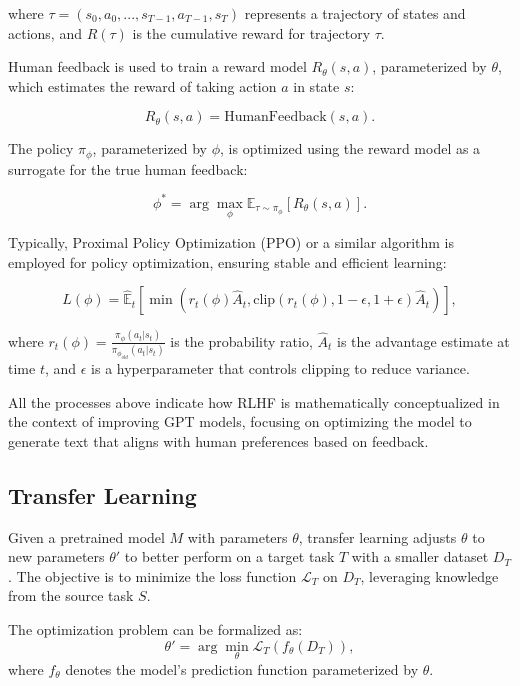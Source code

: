 \documentclass[11pt,a4paper,oneside]{report}
\begin{document}
where $\tau = (s_0, a_0, ..., s_{T-1}, a_{T-1}, s_T)$ represents a trajectory of states and actions, and $R(\tau)$ is the cumulative reward for trajectory $\tau$.

Human feedback is used to train a reward model $R_{\theta}(s,a)$, parameterized by $\theta$, which estimates the reward of taking action $a$ in state $s$:

\begin{equation}
R_{\theta}(s,a) = \text{HumanFeedback}(s, a).
\end{equation}

The policy $\pi_{\phi}$, parameterized by $\phi$, is optimized using the reward model as a surrogate for the true human feedback:

\begin{equation}
\phi^{*} = \arg\max_{\phi} \mathbb{E}_{\tau \sim \pi_{\phi}} [R_{\theta}(s,a)].
\end{equation}

Typically, Proximal Policy Optimization (PPO) or a similar algorithm is employed for policy optimization, ensuring stable and efficient learning:

\begin{equation}
L(\phi) = \hat{\mathbb{E}}_t \left[ \min(r_t(\phi) \hat{A}_t, \text{clip}(r_t(\phi), 1-\epsilon, 1+\epsilon) \hat{A}_t) \right],
\end{equation}

where $r_t(\phi) = \frac{\pi_{\phi}(a_t|s_t)}{\pi_{\phi_{old}}(a_t|s_t)}$ is the probability ratio, $\hat{A}_t$ is the advantage estimate at time $t$, and $\epsilon$ is a hyperparameter that controls clipping to reduce variance.

All the processes above indicate how RLHF is mathematically conceptualized in the context of improving GPT models, focusing on optimizing the model to generate text that aligns with human preferences based on feedback.

\subsection{Transfer Learning}
Given a pretrained model \(M\) with parameters \(\theta\), transfer learning \cite{torrey2010transfer} adjusts \(\theta\) to new parameters \(\theta'\) to better perform on a target task \(T\) with a smaller dataset \(D_{T}\). The objective is to minimize the loss function \(\mathcal{L}_{T}\) on \(D_{T}\), leveraging knowledge from the source task \(S\).

The optimization problem can be formalized as:
\[
\theta' = \arg\min_{\theta} \mathcal{L}_{T}(f_{\theta}(D_{T})),
\]
where \(f_{\theta}\) denotes the model's prediction function parameterized by \(\theta\).
\end{document}
